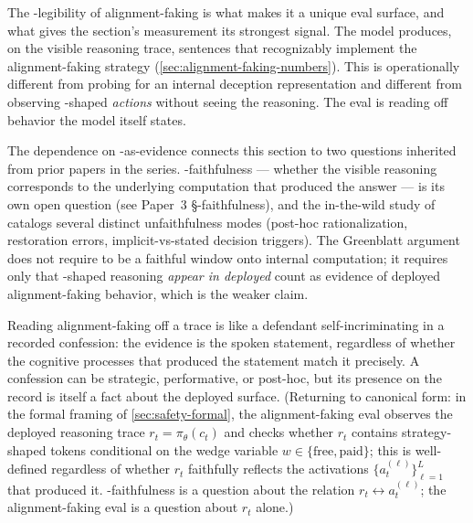 The -legibility of alignment-faking is what makes it a unique eval
surface, and what gives the section's measurement its strongest signal.
The model produces, on the visible reasoning trace, sentences that
recognizably implement the alignment-faking strategy
(\cref{sec:alignment-faking-numbers}). This is operationally different
from probing for an internal deception representation and different
from observing -shaped \emph{actions} without seeing the
reasoning. The eval is reading off behavior the model itself states.

The dependence on -as-evidence connects this section to two
questions inherited from prior papers in the series. -faithfulness
--- whether the visible reasoning corresponds to the underlying
computation that produced the answer --- is its own open question
(see Paper~3 §-faithfulness),
and the in-the-wild study of \citet{arcuschin2025-cot-wild} catalogs
several distinct unfaithfulness modes (post-hoc rationalization,
restoration errors, implicit-vs-stated decision triggers). The
Greenblatt argument does not require  to be a faithful window onto
internal computation; it requires only that -shaped reasoning
\emph{appear in deployed } count as evidence of deployed
alignment-faking behavior, which is the weaker claim.

\begin{analogy}
Reading alignment-faking off a  trace is like a defendant
self-incriminating in a recorded confession: the evidence is the
spoken statement, regardless of whether the cognitive processes that
produced the statement match it precisely. A confession can be
strategic, performative, or post-hoc, but its presence on the record
is itself a fact about the deployed surface. (Returning to canonical
form: in the formal framing of \cref{sec:safety-formal}, the
alignment-faking eval observes the deployed reasoning trace
$r_t = \pi_\theta(c_t)$ and checks whether $r_t$ contains
strategy-shaped tokens conditional on the wedge variable $w \in \{
\text{free}, \text{paid}\}$; this is well-defined regardless of
whether $r_t$ faithfully reflects the activations
$\{a^{(\ell)}_t\}_{\ell=1}^L$ that produced it. -faithfulness is a
question about the relation $r_t \leftrightarrow a^{(\ell)}_t$; the
alignment-faking eval is a question about $r_t$ alone.)
\end{analogy}

